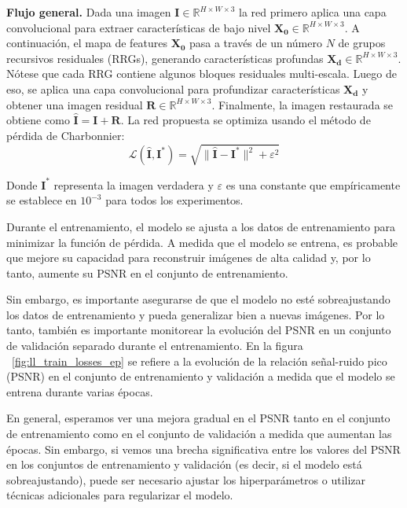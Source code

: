 \documentclass[a4paper,
               ]{jacow}
\begin{document}
\textbf{Flujo general.} Dada una imagen $\mathbf{I} \in \mathbb{R}^{H \times W \times 3}$ la red primero aplica una capa convolucional para extraer características de bajo nivel $\mathbf{X}_{\textbf{0}} \in \mathbb{R}^{H \times W \times 3}$. A continuación, el mapa de features $\mathbf{X}_{\textbf{0}}$ pasa a través de un número $N$ de grupos recursivos residuales (RRGs), generando características profundas $\mathbf{X}_{\textbf{d}} \in \mathbb{R}^{H \times W \times 3}$. Nótese que cada RRG contiene algunos bloques residuales multi-escala. Luego de eso, se aplica una capa convolucional para profundizar características $\mathbf{X}_{\textbf{d}}$ y obtener una imagen residual $\mathbf{R} \in \mathbb{R}^{H \times W \times 3}$. Finalmente, la imagen restaurada se obtiene como $\mathbf{\hat{I}} = \mathbf{I} + \mathbf{R}$. La red propuesta se optimiza usando el método de pérdida de Charbonnier:
\begin{equation*}
\mathcal{L}(\mathbf{\hat{I}}, \mathbf{I^*}) = \sqrt{\lVert\mathbf{\hat{I}} - \mathbf{I^*}\rVert^2 + \varepsilon^2}
\end{equation*}

Donde $\mathbf{I^*}$ representa la imagen verdadera y $\varepsilon$ es una constante que empíricamente se establece en $10^{-3}$ para todos los experimentos.

Durante el entrenamiento, el modelo se ajusta a los datos de entrenamiento para minimizar la función de pérdida. A medida que el modelo se entrena, es probable que mejore su capacidad para reconstruir imágenes de alta calidad y, por lo tanto, aumente su PSNR en el conjunto de entrenamiento.

Sin embargo, es importante asegurarse de que el modelo no esté sobreajustando los datos de entrenamiento y pueda generalizar bien a nuevas imágenes. Por lo tanto, también es importante monitorear la evolución del PSNR en un conjunto de validación separado durante el entrenamiento. En la figura  ~\ref{fig:ll_train_losses_ep} se refiere a la evolución de la relación señal-ruido pico (PSNR) en el conjunto de entrenamiento y validación a medida que el modelo se entrena durante varias épocas.

En general, esperamos ver una mejora gradual en el PSNR tanto en el conjunto de entrenamiento como en el conjunto de validación a medida que aumentan las épocas. Sin embargo, si vemos una brecha significativa entre los valores del PSNR en los conjuntos de entrenamiento y validación (es decir, si el modelo está sobreajustando), puede ser necesario ajustar los hiperparámetros o utilizar técnicas adicionales para regularizar el modelo.
\end{document}
